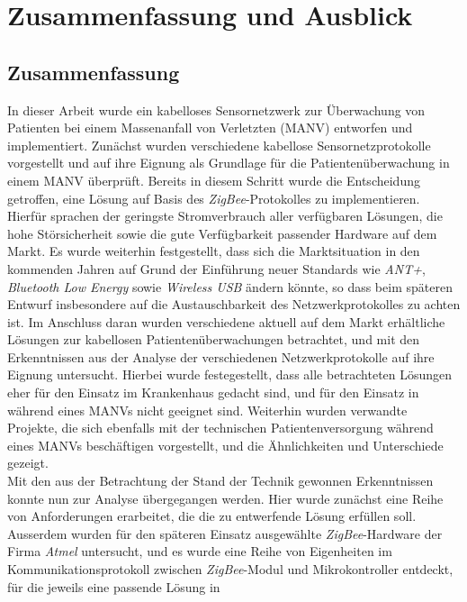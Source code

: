 
\chapter{Zusammenfassung und Ausblick}

\section{Zusammenfassung}
In dieser Arbeit wurde ein kabelloses Sensornetzwerk zur Überwachung von Patienten bei einem 
Massenanfall von Verletzten (MANV) entworfen und implementiert. Zunächst wurden 
verschiedene kabellose Sensornetzprotokolle vorgestellt und auf ihre Eignung als Grundlage für
die Patientenüberwachung in einem MANV überprüft. Bereits in diesem Schritt wurde die Entscheidung
getroffen, eine Lösung auf Basis des \emph{ZigBee}-Protokolles zu implementieren. Hierfür sprachen
der geringste Stromverbrauch aller verfügbaren Lösungen, die hohe Störsicherheit sowie die
gute Verfügbarkeit passender Hardware auf dem Markt. Es wurde weiterhin festgestellt, dass sich die
Marktsituation in den kommenden Jahren auf Grund der Einführung neuer Standards wie \emph{ANT+},
\emph{Bluetooth Low Energy} sowie \emph{Wireless USB} ändern könnte, so dass beim späteren Entwurf
insbesondere auf die Austauschbarkeit des Netzwerkprotokolles zu achten ist. Im Anschluss daran wurden
verschiedene aktuell auf dem Markt erhältliche Lösungen zur kabellosen Patientenüberwachungen betrachtet, 
und mit den Erkenntnissen aus der Analyse der verschiedenen Netzwerkprotokolle auf ihre Eignung untersucht.
Hierbei wurde festegestellt, dass alle betrachteten Lösungen eher für den Einsatz im Krankenhaus
gedacht sind, und für den Einsatz in während eines MANVs nicht geeignet sind. Weiterhin wurden verwandte
Projekte, die sich ebenfalls mit der technischen Patientenversorgung während eines MANVs beschäftigen
vorgestellt, und die Ähnlichkeiten und Unterschiede gezeigt.\\
Mit den aus der Betrachtung der Stand der Technik gewonnen Erkenntnissen konnte nun zur Analyse 
übergegangen werden. Hier wurde zunächst eine Reihe von Anforderungen erarbeitet, die die zu entwerfende 
Lösung erfüllen soll. Ausserdem wurden für den späteren Einsatz ausgewählte \emph{ZigBee}-Hardware 
der Firma \emph{Atmel} untersucht, und es wurde eine Reihe von Eigenheiten im Kommunikationsprotokoll 
zwischen \emph{ZigBee}-Modul und Mikrokontroller entdeckt, für die jeweils eine passende Lösung in 
